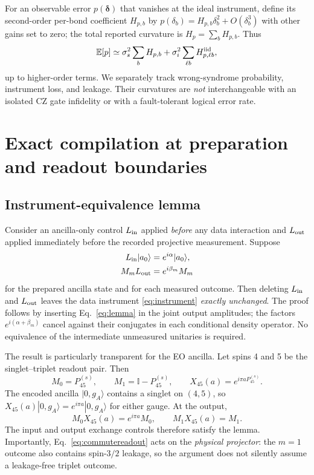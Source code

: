 \documentclass[aps,prx,twocolumn,superscriptaddress,10pt,longbibliography,floatfix]{revtex4-2}
\newcommand{\id}{\mathbb I}
\newcommand{\Ps}{P^{(s)}}
\begin{document}
For an observable error $p(\bm\delta)$ that vanishes at the ideal instrument, define its second-order per-bond coefficient $H_{p,b}$ by $p(\delta_b)=H_{p,b}\delta_b^2+O(\delta_b^3)$ with other gains set to zero; the total reported curvature is $H_p=\sum_b H_{p,b}$. Thus
\begin{equation}
 \mathbb E[p]\simeq\sigma_s^2\sum_b H_{p,b}+\sigma_i^2\sum_{\ell b}H_{p,\ell b}^{\rm iid},
 \label{eq:weaknoise}
\end{equation}
up to higher-order terms. We separately track wrong-syndrome probability, instrument loss, and leakage. Their curvatures are \emph{not} interchangeable with an isolated CZ gate infidelity or with a fault-tolerant logical error rate.

\section{Exact compilation at preparation and readout boundaries}
\label{sec:lemma}
\subsection{Instrument-equivalence lemma}
Consider an ancilla-only control $L_{\rm in}$ applied \emph{before} any data interaction and $L_{\rm out}$ applied immediately before the recorded projective measurement. Suppose
\begin{subequations}\label{eq:lemma}
\begin{align}
 L_{\rm in}|a_0\rangle &=e^{i\alpha}|a_0\rangle,\\
 M_mL_{\rm out}&=e^{i\beta_m}M_m
\end{align}
\end{subequations}
for the prepared ancilla state and for each measured outcome. Then deleting $L_{\rm in}$ and $L_{\rm out}$ leaves the data instrument \eqref{eq:instrument} \emph{exactly unchanged}. The proof follows by inserting Eq.~\eqref{eq:lemma} in the joint output amplitudes; the factors $e^{i(\alpha+\beta_m)}$ cancel against their conjugates in each conditional density operator. No equivalence of the intermediate unmeasured unitaries is required.

The result is particularly transparent for the EO ancilla. Let spins 4 and 5 be the singlet--triplet readout pair. Then
\begin{equation}
 M_0=\Ps_{45},\qquad M_1=\id-\Ps_{45},\qquad X_{45}(a)=e^{i\pi a\Ps_{45}}.
\end{equation}
The encoded ancilla $|0,g_A\rangle$ contains a singlet on $(4,5)$, so $X_{45}(a)|0,g_A\rangle=e^{i\pi a}|0,g_A\rangle$ for either gauge. At the output,
\begin{equation}
 M_0X_{45}(a)=e^{i\pi a}M_0,\qquad M_1X_{45}(a)=M_1.
 \label{eq:commutereadout}
\end{equation}
The input and output exchange controls therefore satisfy the lemma. Importantly, Eq.~\eqref{eq:commutereadout} acts on the \emph{physical projector}: the $m=1$ outcome also contains spin-$3/2$ leakage, so the argument does not silently assume a leakage-free triplet outcome.
\end{document}
